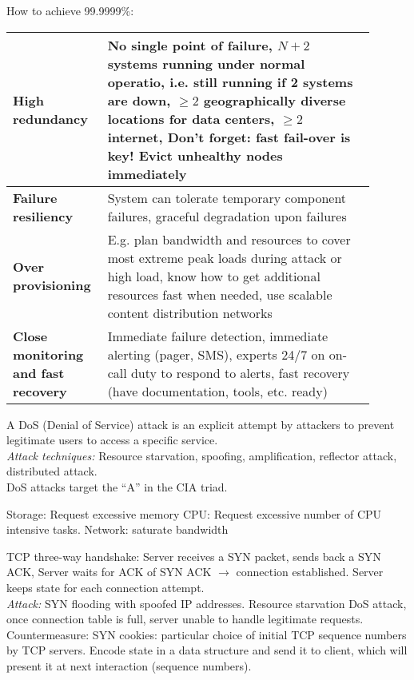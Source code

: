 How to achieve 99.9999\%:

\begin{tabular}{p{0.2\linewidth}p{0.7\linewidth}}
\textbf{High redundancy} & No single point of failure, $N+2$ systems running under normal operatio, i.e. still running if 2 systems are down, $\geq 2$ geographically diverse locations for data centers, $\geq 2$ internet, Don't forget: fast fail-over is key! Evict unhealthy nodes immediately \\
\hline
\textbf{Failure resiliency} & System can tolerate temporary component failures, graceful degradation upon failures \\
\hline
\textbf{Over provisioning} & E.g. plan bandwidth and resources to cover most
extreme peak loads during attack or high load, know how to get additional resources fast when
needed, use scalable content distribution networks \\
\hline
\textbf{Close monitoring and fast recovery} & Immediate failure detection, immediate alerting (pager, SMS), experts 24/7 on on-call duty to respond to alerts, fast recovery (have documentation, tools, etc. ready)\\
\end{tabular}


 A DoS (Denial of Service) attack is an explicit attempt by attackers to prevent legitimate users to access a specific service.\\
\textit{Attack techniques:} Resource starvation, spoofing, amplification, reflector attack, distributed attack.\\
DoS attacks target the ``A'' in the CIA triad.

 Storage: Request excessive memory CPU: Request excessive number of CPU intensive tasks. Network: saturate bandwidth

 TCP three-way handshake: Server receives a SYN packet, sends back a SYN ACK, Server waits for ACK of SYN ACK $\to$ connection established. Server keeps state for each connection attempt.\\
\textit{Attack:} SYN flooding with spoofed IP addresses. Resource starvation DoS attack, once connection table is full, server unable to handle legitimate requests. Countermeasure: SYN cookies: particular choice of initial TCP sequence numbers by TCP servers. Encode state in a data structure and send it to client, which will present it at next interaction (sequence numbers).

